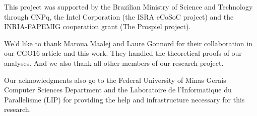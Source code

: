 This project was supported by the
Brazilian Ministry of Science and Technology through CNPq,
the Intel Corporation (the ISRA eCoSoC project) and the INRIA-FAPEMIG
cooperation grant (The Prospiel project).

We'd like to thank Maroua Maalej and Laure Gonnord for their collaboration in 
our CGO16 article and this work. They handled the theoretical proofs of 
our analyses. And we also thank all other members of our research project.

Our acknowledgments also go to the Federal University of Minas Gerais 
Computer Sciences Department and the Laboratoire de l'Informatique du 
Parallelisme (LIP) for providing the help and infrastructure necessary 
for this research.


 
